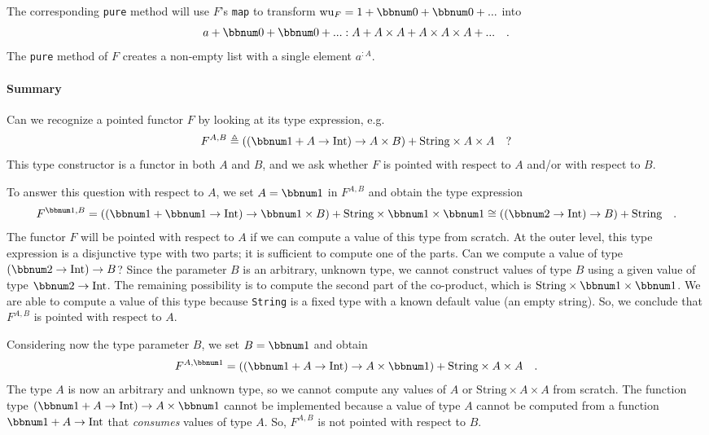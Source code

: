 The corresponding \lstinline!pure! method will use $F$'s \lstinline!map!
to transform $\text{wu}_{F}=1+\bbnum 0+\bbnum 0+...$ into 
\[
a+\bbnum 0+\bbnum 0+...:A+A\times A+A\times A\times A+...\quad.
\]
The \lstinline!pure! method of $F$ creates a non-empty list with
a single element $a^{:A}$.

\paragraph{Summary}

Can we recognize a pointed functor $F$ by looking at its type expression,
e.g.
\[
F^{A,B}\triangleq\left((\bbnum 1+A\rightarrow\text{Int})\rightarrow A\times B\right)+\text{String}\times A\times A\quad?
\]
This type constructor is a functor in both $A$ and $B$, and we ask
whether $F$ is pointed with respect to $A$ and/or with respect to
$B$.

To answer this question with respect to $A$, we set $A=\bbnum 1$
in $F^{A,B}$ and obtain the type expression
\[
F^{\bbnum 1,B}=\left((\bbnum 1+\bbnum 1\rightarrow\text{Int})\rightarrow\bbnum 1\times B\right)+\text{String}\times\bbnum 1\times\bbnum 1\cong\left(\left(\bbnum 2\rightarrow\text{Int}\right)\rightarrow B\right)+\text{String}\quad.
\]
The functor $F$ will be pointed with respect to $A$ if we can compute
a value of this type from scratch. At the outer level, this type expression
is a disjunctive type with two parts; it is sufficient to compute
one of the parts. Can we compute a value of type $\left(\bbnum 2\rightarrow\text{Int}\right)\rightarrow B$?
Since the parameter $B$ is an arbitrary, unknown type, we cannot
construct values of type $B$ using a given value of type $\bbnum 2\rightarrow\text{Int}$.
The remaining possibility is to compute the second part of the co-product,
which is $\text{String}\times\bbnum 1\times\bbnum 1$. We are able
to compute a value of this type because \lstinline!String! is a fixed
type with a known default value (an empty string). So, we conclude
that $F^{A,B}$ is pointed with respect to $A$.

Considering now the type parameter $B$, we set $B=\bbnum 1$ and
obtain
\[
F^{A,\bbnum 1}=\left((\bbnum 1+A\rightarrow\text{Int})\rightarrow A\times\bbnum 1\right)+\text{String}\times A\times A\quad.
\]
The type $A$ is now an arbitrary and unknown type, so we cannot compute
any values of $A$ or $\text{String}\times A\times A$ from scratch.
The function type $(\bbnum 1+A\rightarrow\text{Int})\rightarrow A\times\bbnum 1$
cannot be implemented because a value of type $A$ cannot be computed
from a function $\bbnum 1+A\rightarrow\text{Int}$ that \emph{consumes}
values of type $A$. So, $F^{A,B}$ is not pointed with respect to
$B$.

